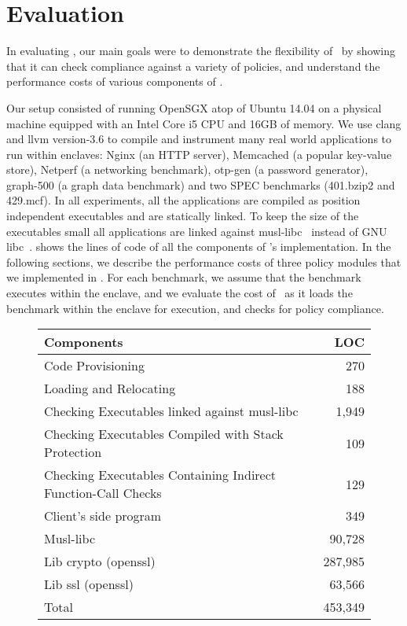 \section{Evaluation}
\label{section:evaluation}

In evaluating \tool, our main goals were to demonstrate the flexibility of
\tool\ by showing that it can check compliance against a variety of policies,
and understand the performance costs of various components of \tool.

Our setup consisted of running OpenSGX atop of Ubuntu 14.04 on a physical
machine  equipped with an Intel Core i5 CPU and 16GB of memory. We use clang
and llvm version-3.6 to compile and instrument many real world applications to
run within enclaves: Nginx (an HTTP server), Memcached (a popular key-value
store), Netperf (a networking benchmark), otp-gen (a password generator),
graph-500 (a graph data benchmark) and two SPEC benchmarks (401.bzip2 and
429.mcf). In all experiments, all the applications are compiled as position
independent executables and are statically linked. To keep the size of the
executables small all applications are linked against musl-libc~\cite{musllibc}
instead of GNU libc~\cite{gnulibc}.  shows the lines of code
of all the components of \tool's implementation. In the following sections, we
describe the performance costs of three policy modules that we implemented in
\tool. For each benchmark, we assume that the benchmark executes within the
enclave, and we evaluate the cost of \tool\ as it loads the benchmark within
the enclave for execution, and checks for policy compliance.

\begin{figure}[t!]
\centering
\footnotesize{
\begin{tabular}{|p{}|r|}
\hline
 \bf Components                    & \bf LOC \\
\hline
Code Provisioning & 270\\
\hline
Loading and Relocating & 188\\
\hline
Checking Executables linked against musl-libc & 1,949\\
\hline
Checking Executables Compiled with Stack Protection & 109\\
\hline
Checking Executables Containing Indirect Function-Call Checks & 129\\
\hline
Client's side program & 349\\
\hline
Musl-libc & 90,728\\
\hline
Lib crypto (openssl) & 287,985\\
\hline
Lib ssl (openssl) & 63,566\\
\hline
Total & 453,349\\
\hline
\end{tabular}}
{\label{table:tcb}}
\indent\vspace{-0.5cm}
\end{figure}

